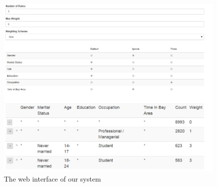 \begin{figure}[ht]
\vspace{-5pt}
\centering
\includegraphics[width=160mm,frame]{graphs/tsapp_screenshot.jpg}
\vspace{-10pt}
\caption{The web interface of our system \label{fig:interface}}
\vspace{-20pt}
\end{figure}